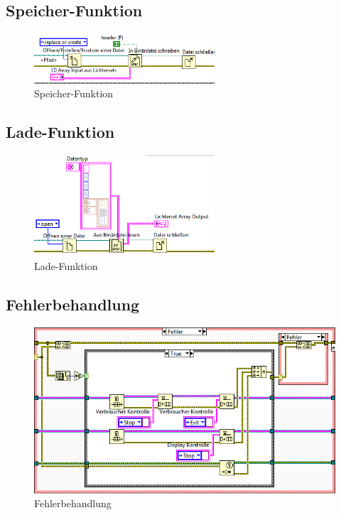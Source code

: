 	\subsection{Speicher-Funktion}
	\begin{figure}[h!]
	\centering
		\includegraphics[width=0.6\textwidth]{Pics/speichern.png}
	\caption{Speicher-Funktion}
	\label{fig:a11}
	\end{figure}
	
	\subsection{Lade-Funktion}
	\begin{figure}[h!]
	\centering
		\includegraphics[width=0.6\textwidth]{Pics/laden.png}
	\caption{Lade-Funktion}
	\label{fig:a12}
	\end{figure}
	
	\subsection{Fehlerbehandlung}
	\begin{figure}[h!]
	\centering
		\includegraphics[width=\textwidth]{Pics/fehler.png}
	\caption{Fehlerbehandlung}
	\label{fig:a13}
	\end{figure}
	
